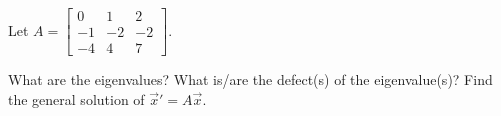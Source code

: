 \documentclass{ximera}
\begin{document}
\begin{exercise}
    Let $A = 
    \left[ 
        \begin{smallmatrix}
            0 & 1 & 2 \\
            -1 & -2 & -2 \\
            -4 & 4 & 7
        \end{smallmatrix} 
    \right]$.
    \begin{tasks}
        \task What are the eigenvalues?
        \task What is/are the defect(s) of the eigenvalue(s)?
        \task Find the general solution of ${\vec{x}}' = A \vec{x}$.
    \end{tasks}
\end{exercise}
\end{document}
